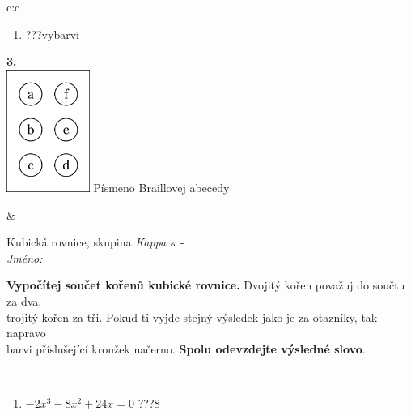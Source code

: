 \documentclass[10pt]{report}
\begin{document}
\begin{tabular}{c:c}
\begin{minipage}[c][104.5mm][t]{0.5\linewidth}
\begin{center}
\begin{minipage}{0.79\linewidth}
\begin{center}
\begin{varwidth}{\linewidth}
\begin{enumerate}
\item \quad \dotfill\; ???\;\dotfill \quad vybarvi
\end{enumerate}
\end{varwidth}
\end{center}
\end{minipage}
\begin{minipage}{0.20\linewidth}
\begin{center}
{\Huge\bfseries 3.} \\[2mm]
\includegraphics[height=40mm]{../images/braille.png}
{\small Písmeno Braillovej abecedy}
\end{center}
\end{minipage}
\end{center}
\end{minipage}
&
\begin{minipage}[c][104.5mm][t]{0.5\linewidth}
\begin{center}
\vspace{7mm}
{\huge Kubická rovnice, skupina \textit{Kappa $\kappa$} -}\\[5mm]
\textit{Jméno:}\phantom{xxxxxxxxxxxxxxxxxxxxxxxxxxxxxxxxxxxxxxxxxxxxxxxxxxxxxxxxxxxxxxxxx}\\[5mm]
\begin{minipage}{0.95\linewidth}
\begin{center}
\textbf{Vypočítej součet kořenů kubické rovnice.} Dvojitý kořen považuj do součtu za dva,\\trojitý kořen za tři. Pokud ti vyjde stejný výsledek jako je za otazníky, tak napravo\\barvi příslušející kroužek načerno. \textbf{Spolu odevzdejte výsledné slovo}.
\end{center}
\end{minipage}
\\[1mm]
\begin{minipage}{0.79\linewidth}
\begin{center}
\begin{varwidth}{\linewidth}
\begin{enumerate}
\Large
\item $-2x^3-8x^2+24x=0$\quad \dotfill\; ???\;\dotfill \quad $8$

\end{enumerate}
\end{varwidth}
\end{center}
\end{minipage}
\end{center}
\end{minipage}
\end{tabular}
\end{document}
